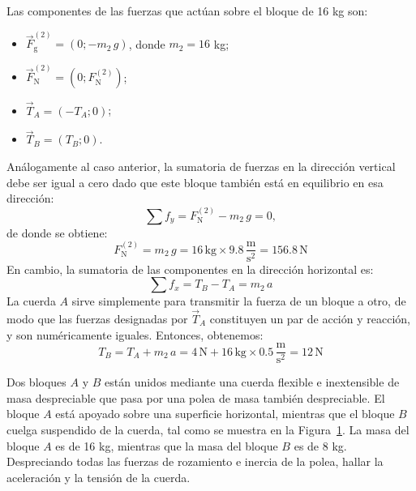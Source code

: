 \documentclass[addpoints]{exam}
\begin{document}
\begin{questions}
\begin{solution}
        Las componentes de las fuerzas que actúan sobre el bloque de 16 kg son:
        \begin{itemize}
            \item $\vec{F}_\text{g}^{(2)} = \left(0; - m_2 \, g\right)$, donde $m_2 = 16$ kg;
            \item $\vec{F}_{\text{N}}^{(2)} = \left(0;F_{\text{N}}^{(2)}\right)$;
            \item $\vec{T}_A = \left(-T_A; 0\right)$;
            \item $\vec{T}_B = \left(T_B; 0\right)$.
        \end{itemize}
        Análogamente al caso anterior, la sumatoria de fuerzas en la dirección vertical debe ser igual a cero dado que este bloque también está en equilibrio en esa dirección: $$\sum f_y = F_{\text{N}}^{(2)} - m_2 \, g = 0,$$ de donde se obtiene: $$F_{\text{N}}^{(2)} = m_2 \, g = 16 \, \text{kg} \times 9.8 \, \frac{\text{m}}{\text{s}^2} = 156.8 \, \text{N}$$ En cambio, la sumatoria de las componentes en la dirección horizontal es: $$ \sum f_x = T_B - T_A = m_2 \, a$$ La cuerda $A$ sirve simplemente para transmitir la fuerza de un bloque a otro, de modo que las fuerzas designadas por $\vec{T}_A$ constituyen un par de acción y reacción, y son numéricamente iguales. Entonces, obtenemos: $$T_B = T_A + m_2 \, a = 4 \, \text{N} + 16 \, \text{kg} \times 0.5 \, \frac{\text{m}}{\text{s}^2} = 12 \, \text{N}$$
    \end{solution}

    \question Dos bloques $A$ y $B$ están unidos mediante una cuerda flexible e inextensible de masa despreciable que pasa por una polea de masa también despreciable. El bloque $A$ está apoyado sobre una superficie horizontal, mientras que el bloque $B$ cuelga suspendido de la cuerda, tal como se muestra en la Figura~\ref{fig:vinculados2}. La masa del bloque $A$ es de 16 kg, mientras que la masa del bloque $B$ es de 8 kg. Despreciando todas las fuerzas de rozamiento e inercia de la polea, hallar la aceleración y la tensión de la cuerda.

    \begin{figure}[h]
        \centering
        \caption{ }
        \label{fig:vinculados2}
    \end{figure}


\end{questions}
\end{document}
